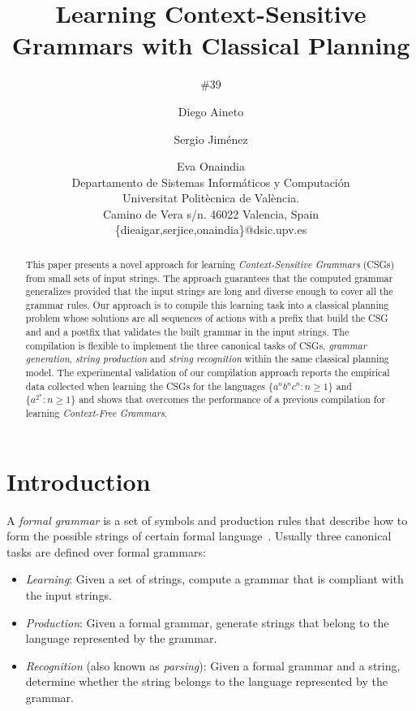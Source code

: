 \documentclass[letterpaper]{article} %
\begin{document}
\title{Learning Context-Sensitive Grammars with Classical Planning}
\author{\#39}


\author{Diego Aineto\and Sergio Jim\'enez\and Eva Onaindia\\
{\small Departamento de Sistemas Inform\'aticos y Computaci\'on}\\
{\small Universitat Polit\`ecnica de Val\`encia.}\\
{\small Camino de Vera s/n. 46022 Valencia, Spain}\\
{\small \{dieaigar,serjice,onaindia\}@dsic.upv.es}}

\maketitle
\begin{abstract}
This paper presents a novel approach for learning {\em Context-Sensitive Grammars} (CSGs) from small sets of input strings. The approach guarantees that the computed grammar generalizes provided that the input strings are long and diverse enough to cover all the grammar rules.  Our approach is to compile this learning task into a classical planning problem whose solutions are all sequences of actions with a prefix that build the CSG and and a postfix that validates the built grammar in the input strings. The compilation is flexible to implement the three canonical tasks of CSGs, {\it grammar generation}, {\it string production} and {\it string recognition} within the same classical planning model. The experimental validation of our compilation approach reports the empirical data collected when learning the CSGs for the languages $\{a^nb^nc^n : n \geq 1 \}$ and $\{a^{2^n} : n \geq 1 \}$ and shows that overcomes the performance  of a previous compilation for learning {\em Context-Free Grammars}.
\end{abstract}


\section{Introduction}
\label{sec:section1}
A {\em formal grammar} is a set of symbols and production rules that describe how to form the possible strings of certain formal language~\cite{hopcroft:automatatheory:2001}. Usually three canonical tasks are defined over formal grammars:
\begin{itemize}
\item {\it Learning}: Given a set of strings, compute a grammar that is compliant with the input strings.
\item {\it Production}: Given a formal grammar, generate strings that belong to the language represented by the grammar.
\item {\it Recognition} (also known as {\em parsing}): Given a formal grammar and a string, determine whether the string belongs to the language represented by the grammar.
\end{itemize}
\end{document}
